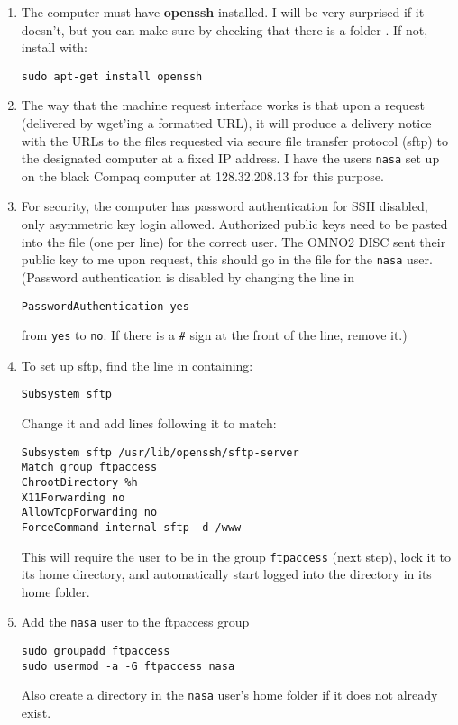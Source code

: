 \documentclass[12pt]{article}
\begin{document}
	\begin{enumerate}
	\item The computer must have \textbf{openssh} installed. I will be very surprised if it doesn't, but you can make sure by checking that there is a folder . If not, install with:
	\begin{lstlisting}
sudo apt-get install openssh
	\end{lstlisting}
	
	\item The way that the machine request interface works is that upon a request (delivered by wget'ing a formatted URL), it will produce a delivery notice with the URLs to the files requested via secure file transfer protocol (sftp) to the designated computer at a fixed IP address.  I have the users \lstinline$nasa$ set up on the black Compaq computer at 128.32.208.13 for this purpose. 
	
	\item For security, the computer has password authentication for SSH disabled, only asymmetric key login allowed. Authorized public keys need to be pasted into the  file (one per line) for the correct user. The OMNO2 DISC sent their public key to me upon request, this should go in the  file for the \lstinline$nasa$ user. (Password authentication is disabled by changing the line in 
	\begin{lstlisting}
PasswordAuthentication yes
	\end{lstlisting}
	from \lstinline$yes$ to \lstinline$no$. If there is a \lstinline$#$ sign at the front of the line, remove it.)
	
	\item To set up sftp, find the line in  containing:
	\begin{lstlisting}
Subsystem sftp
	\end{lstlisting}
	Change it and add lines following it to match:
	\begin{lstlisting}
Subsystem sftp /usr/lib/openssh/sftp-server
Match group ftpaccess
ChrootDirectory %h
X11Forwarding no
AllowTcpForwarding no
ForceCommand internal-sftp -d /www
	\end{lstlisting}
	
	This will require the user to be in the group \lstinline$ftpaccess$ (next step), lock it to its home directory, and automatically start logged into the  directory in its home folder.
	
	\item Add the \lstinline$nasa$ user to the ftpaccess group
	\begin{lstlisting}
sudo groupadd ftpaccess
sudo usermod -a -G ftpaccess nasa
	\end{lstlisting}
	Also create a 	 directory in the \lstinline$nasa$ user's home folder if it does not already exist.	
	
	\end{enumerate}
\end{document}
